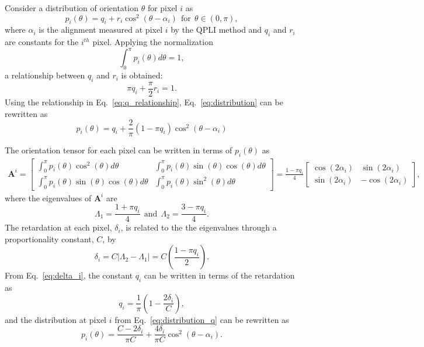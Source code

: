 \documentclass[]{interact}
\begin{document}
Consider a distribution of orientation $\theta$ for pixel $i$ as 
%
\begin{equation}
p_i(\theta) = q_i + r_i\cos^2(\theta - \alpha_i) \ \ \text{for} \ \ \theta \in (0,\pi),
\label{eq:distribution}
\end{equation}
%
where $\alpha_i$ is the alignment measured at pixel $i$ by the QPLI method and $q_i$ and $r_i$ are constants for the $i^{th}$ pixel. Applying the normalization 
%
\begin{equation}
\int_0^{\pi}p_i(\theta)d\theta = 1,
\end{equation}
%
a relationship between $q_i$ and $r_i$ is obtained:
%
\begin{equation}
\pi q_i + \frac{\pi}{2}r_i = 1.
\label{eq:q_relationship}
\end{equation}
%
Using the relationship in Eq.\ \eqref{eq:q_relationship}, Eq.\ \eqref{eq:distribution} can be rewritten as
%
\begin{equation}
p_i(\theta) = q_i + \frac{2}{\pi}(1-\pi q_i)\cos^2(\theta-\alpha_i)
\label{eq:distribution_q}
\end{equation}
%

The orientation tensor for each pixel can be written in terms of $p_i(\theta)$ as
%
\begin{eqnarray}
\pmb{A}^i = 
\begin{bmatrix}
\int_0^{\pi} p_i(\theta) \cos^2(\theta)d\theta & \int_0^{\pi} p_i(\theta) \sin(\theta) \cos(\theta)d\theta \\
\int_0^{\pi} p_i(\theta) \sin(\theta) \cos(\theta)d\theta & \int_0^{\pi} p_i(\theta) \sin^2(\theta)d\theta
\end{bmatrix} = 
%
\frac{1-\pi q_i}{4} 
\begin{bmatrix}
\cos(2 \alpha_i) & \sin(2 \alpha_i) \\
\sin(2\alpha_i) & - \cos(2\alpha_i)
\end{bmatrix},
\label{eq:Ai}
\end{eqnarray}
%
where the eigenvalues of $\pmb{A}^i$ are
\begin{equation}
\Lambda_1 = \frac{1+\pi q_i}{4} \ \ \text{and} \ \ \Lambda_2 = \frac{3-\pi q_i}{4}. 
\end{equation}
%
The retardation at each pixel, $\delta_i$, is related to the the eigenvalues through a proportionality constant, $C$, by
%
\begin{equation}
\delta_i = C |\Lambda_2 - \Lambda_1| = C \left(\frac{1-\pi q_i}{2}\right).
\label{eq:delta_i}
\end{equation}
%
From Eq.\ \eqref{eq:delta_i}, the constant $q_i$ can be written in terms of the retardation as
%
\begin{equation}
q_i = \frac{1}{\pi}\left(1-\frac{2\delta_i}{C}\right),
\end{equation}
%
and the distribution at pixel $i$ from Eq.\ \eqref{eq:distribution_q} can be rewritten as
%
\begin{equation}
p_i(\theta) = \frac{C-2\delta_i}{\pi C} + \frac{4 \delta_i}{\pi C}\cos^2(\theta-\alpha_i).
\label{eq:distribution_delta}
\end{equation}
%
\end{document}
